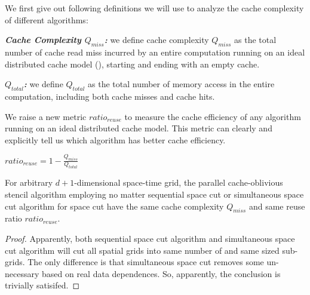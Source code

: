  We first give out following
definitions we will use to analyze the cache complexity of different
algorithms:

\begin{mydef}
\emph{\bf Cache Complexity $Q_{miss}$:} \cite{FrigoSt09} we define cache complexity
$Q_{miss}$ as the total number of cache read miss incurred by an
entire computation running on an ideal distributed cache model
(), starting and ending with an empty cache.
\label{def:cacheMiss}
\end{mydef}

\begin{mydef}
\emph{\bf $Q_{total}$:} we define $Q_{total}$ as the total number of
memory access in the entire computation, including both cache misses
and cache hits.
\label{def:cacheTotal}
\end{mydef}

We raise a new metric $ratio_{reuse}$ to measure the cache efficiency
of any algorithm running on an ideal distributed cache model. This
metric can clearly and explicitly tell us which algorithm has better 
cache efficiency.

\begin{mydef}
\emph{\bf $ratio_{reuse} = 1 - \frac{Q_{miss}}{Q_{total}}$}
\end{mydef}


\begin{theorem}
For arbitrary $d+1$-dimensional space-time grid, the parallel
cache-oblivious stencil algorithm employing no matter sequential space
cut or simultaneous space cut algorithm for space cut have the same
cache complexity $Q_{miss}$ and same reuse ratio $ratio_{reuse}$.
\label{thm:cacheSeqSim}
\end{theorem}

\begin{proof}
Apparently, both sequential space cut algorithm and simultaneous space
cut algorithm will cut all spatial grids into same number of and same
sized sub-grids. The only difference is that simultaneous space cut
removes some un-necessary  based on real data dependences. 
So, apparently, the conclusion is trivially satisifed.
\end{proof}

